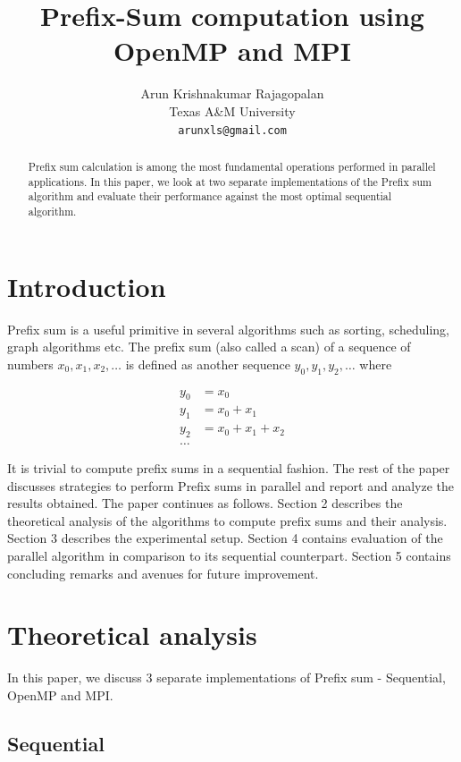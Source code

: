 \documentclass[11pt]{article}
\title{Prefix-Sum computation using OpenMP and MPI}
\author{Arun Krishnakumar Rajagopalan \\
  Texas A\&M University \\
  {\tt arunxls@gmail.com} \\}
\date{}
\begin{document}
\maketitle
\begin{abstract}
  Prefix sum calculation is among the most fundamental operations performed in parallel applications. In this paper, we look at two separate implementations of the Prefix sum algorithm and evaluate their performance against the most optimal sequential algorithm.
\end{abstract}

\section{Introduction}

Prefix sum is a useful primitive in several algorithms such as sorting, scheduling, graph algorithms etc. The prefix sum (also called a scan) of a sequence of numbers $x_{0}, x_{1}, x_{2},\ldots$ is defined as another sequence $y_{0}, y_{1}, y_{2},\ldots$ where

\begin{align*} 
y_{0} &= x_{0} \\ 
y_{1} &= x_{0} + x_{1} \\
y_{2} &= x_{0} + x_{1} + x_{2} \\
\ldots
\end{align*}

It is trivial to compute prefix sums in a sequential fashion. The rest of the paper discusses strategies to perform Prefix sums in parallel and report and analyze the results obtained. The paper continues as follows. Section 2 describes the theoretical analysis of the algorithms to compute prefix sums and their analysis. Section 3 describes the experimental setup. Section 4 contains evaluation of the parallel algorithm in comparison to its sequential counterpart. Section 5 contains concluding remarks and avenues for future improvement.

\section{Theoretical analysis}

In this paper, we discuss 3 separate implementations of Prefix sum - Sequential, OpenMP and MPI. 

\subsection{Sequential}
\end{document}
